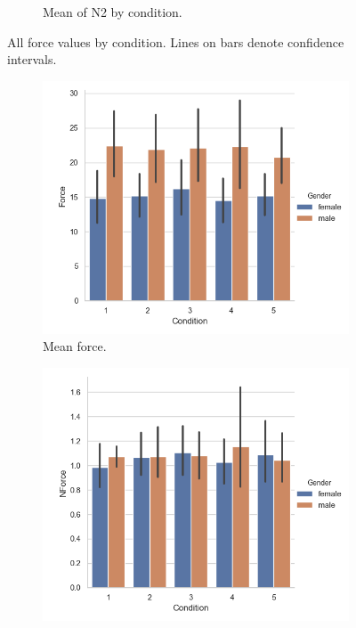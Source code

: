 \begin{figure}[H]
\begin{subfigure}[b]{0.4\textwidth}
         \caption{Mean of N2 by condition.}
         \label{fig:allForceNormMean}
     \end{subfigure} 
     
      \caption{All force values by condition. Lines on bars denote confidence intervals.}
         \label{fig:allForceCond}
\end{figure} 
\begin{figure}[H]
     \begin{subfigure}[b]{0.3\textwidth}
         \centering
         \includegraphics[scale=0.4]{Files/Plots/force_mean_by_condition__gen.png}
         \caption{Mean force.}
         \label{fig:forceMeanCondGen}
     \end{subfigure}
     \begin{subfigure}[b]{0.3\textwidth}
         \centering
         \includegraphics[scale=0.4]{Files/Plots/forceNforce_mean_by_condition_gen.png}

\end{subfigure}
\end{figure}
